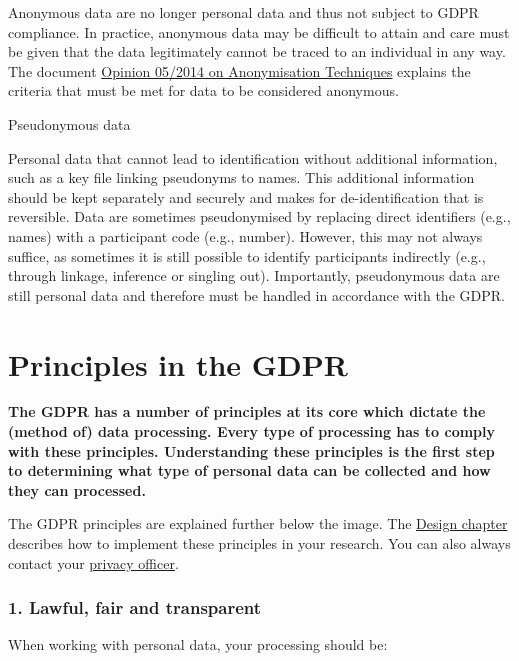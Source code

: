 \documentclass[
]{book}
\begin{document}
Anonymous data are no longer personal data and thus not subject to GDPR
compliance. In practice, anonymous data may be difficult to attain and care
must be given that the data legitimately cannot be traced to an individual in
any way. The document
\href{https://ec.europa.eu/justice/article-29/documentation/opinion-recommendation/files/2014/wp216_en.pdf}{Opinion 05/2014 on Anonymisation Techniques}
explains the criteria that must be met for data to be considered anonymous.

Pseudonymous data

Personal data that cannot lead to identification without additional
information, such as a key file linking pseudonyms to names. This additional
information should be kept separately and securely and makes for
de-identification that is reversible. Data are sometimes pseudonymised by
replacing direct identifiers (e.g., names) with a participant code (e.g.,
number). However, this may not always suffice, as sometimes it is still
possible to identify participants indirectly (e.g., through linkage, inference
or singling out). Importantly, pseudonymous data are still personal data and
therefore must be handled in accordance with the GDPR.

\hypertarget{gdpr-principles}{%
\section{Principles in the GDPR}\label{gdpr-principles}}

\textbf{The GDPR has a number of principles at its core which dictate the (method of)
data processing. Every type of processing has to comply with these principles.
Understanding these principles is the first step to determining what type of
personal data can be collected and how they can processed.}

The GDPR principles are explained further below the image. The
\protect\hyperlink{privacy-by-design}{Design chapter} describes how to implement these principles
in your research. You can also always contact your \protect\hyperlink{support}{privacy officer}.

\hypertarget{lawful-fair-and-transparent}{%
\subsubsection{1. Lawful, fair and transparent}\label{lawful-fair-and-transparent}}

When working with personal data, your processing should be:
\end{document}
